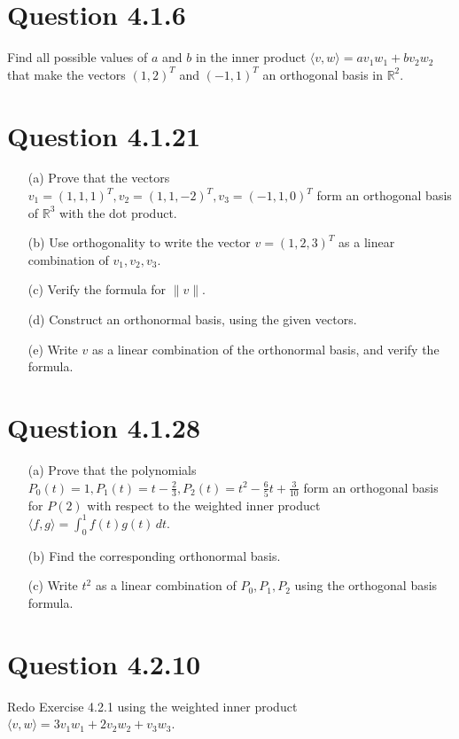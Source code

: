 \documentclass[12pt]{article}
\begin{document}
\section*{Question 4.1.6}
Find all possible values of \( a \) and \( b \) in the inner product \( \langle v, w \rangle = a v_1 w_1 + b v_2 w_2 \) that make the vectors \( (1, 2)^T \) and \( (-1, 1)^T \) an orthogonal basis in \( \mathbb{R}^2 \).

\section*{Question 4.1.21}
\begin{itemize}
    \item[(a)] Prove that the vectors \( v_1 = (1, 1, 1)^T, v_2 = (1, 1, -2)^T, v_3 = (-1, 1, 0)^T \) form an orthogonal basis of \( \mathbb{R}^3 \) with the dot product.
    \item[(b)] Use orthogonality to write the vector \( v = (1, 2, 3)^T \) as a linear combination of \( v_1, v_2, v_3 \).
    \item[(c)] Verify the formula for \( \| v \|\).
    \item[(d)] Construct an orthonormal basis, using the given vectors.
    \item[(e)] Write \( v \) as a linear combination of the orthonormal basis, and verify the formula.
\end{itemize}

\section*{Question 4.1.28}
\begin{itemize}
    \item[(a)] Prove that the polynomials \( P_0(t) = 1, P_1(t) = t - \frac{2}{3}, P_2(t) = t^2 - \frac{6}{5}t + \frac{3}{10} \) form an orthogonal basis for \( P(2) \) with respect to the weighted inner product \( \langle f, g \rangle = \int_0^1 f(t)g(t) \, dt \).
    \item[(b)] Find the corresponding orthonormal basis.
    \item[(c)] Write \( t^2 \) as a linear combination of \( P_0, P_1, P_2 \) using the orthogonal basis formula.
\end{itemize}
\section*{Question 4.2.10}
Redo Exercise 4.2.1 using the weighted inner product \( \langle v, w \rangle = 3v_1 w_1 + 2v_2 w_2 + v_3 w_3 \).
\end{document}
